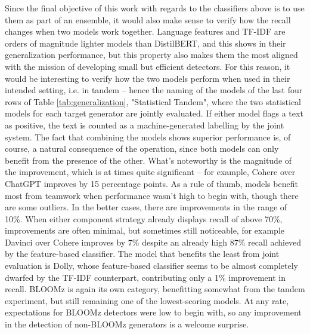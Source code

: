 Since the final objective of this work with regards to the classifiers above is to use them as part of an ensemble, it would also make sense to verify how the recall changes when two models work together.
Language features and TF-IDF are orders of magnitude lighter models than DistilBERT, and this shows in their generalization performance, but this property also makes them the most aligned with the mission of developing small but efficient detectors.
For this reason, it would be interesting to verify how the two models perform when used in their intended setting, i.e. in tandem -- hence the naming of the models of the last four rows of Table \ref{tab:generalization}, "Statistical Tandem", where the two statistical models for each target generator are jointly evaluated.
If either model flags a text as positive, the text is counted as a machine-generated labelling by the joint system.
The fact that combining the models shows superior performance is, of course, a natural consequence of the operation, since both models can only benefit from the presence of the other.
What's noteworthy is the magnitude of the improvement, which is at times quite significant -- for example, Cohere over ChatGPT improves by 15 percentage points.
As a rule of thumb, models benefit most from teamwork when performance wasn't high to begin with, though there are some outliers.
In the better cases, there are improvements in the range of 10\%.
When either component strategy already displays recall of above 70\%, improvements are often minimal, but sometimes still noticeable, for example Davinci over Cohere improves by 7\% despite an already high 87\% recall achieved by the feature-based classifier.
The model that benefits the least from joint evaluation is Dolly, whose feature-based classifier seems to be almost completely dwarfed by the TF-IDF counterpart, contributing only a 1\% improvement in recall.
BLOOMz is again its own category, benefitting somewhat from the tandem experiment, but still remaining one of the lowest-scoring models.
At any rate, expectations for BLOOMz detectors were low to begin with, so any improvement in the detection of non-BLOOMz generators is a welcome surprise.

